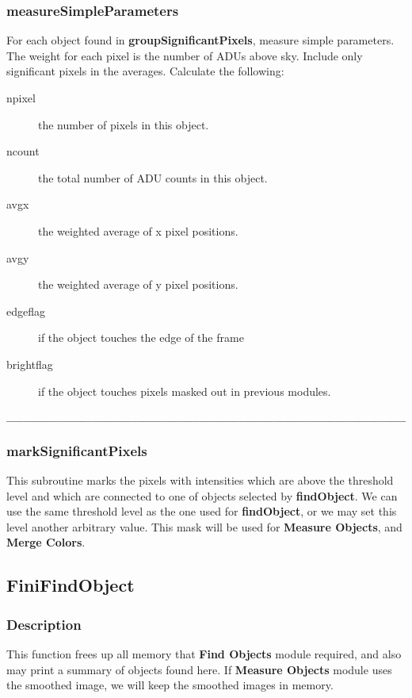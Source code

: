 \subsubsection{measureSimpleParameters}
For each object found in {\bf groupSignificantPixels},
measure simple parameters.
The weight for each pixel is the number of ADUs above sky.  Include only
significant pixels in the averages.  Calculate the following:
\begin{description}
\item[\quad npixel] the number of pixels in this object.
\item[\quad ncount] the total number of ADU counts in this object.
\item[\quad avgx] the weighted average of x pixel positions.
\item[\quad avgy] the weighted average of y pixel positions.
\item[\quad edgeflag] if the object touches the edge of the frame
\item[\quad brightflag] if the object touches pixels masked out in 
    previous modules.
\end{description}

\begin{verbatim}
__________________________________________________________________________
\end{verbatim}

\subsubsection{markSignificantPixels}

\begin{descrip}
This subroutine marks the pixels with intensities
which are above the threshold 
level and which are connected to one of objects selected by {\bf findObject}.
We can use the same threshold level as the one used for {\bf findObject}, or 
we may set this level another arbitrary value. This mask will be used for 
{\bf Measure Objects}, and {\bf Merge Colors}.
\end{descrip}

\subsection{FiniFindObject}

\subsubsection{Description}

This function frees
up all memory that {\bf Find Objects} module required, and also may print
a summary of objects found here. If {\bf Measure Objects } module uses
the smoothed image, we will keep the smoothed images in memory.

